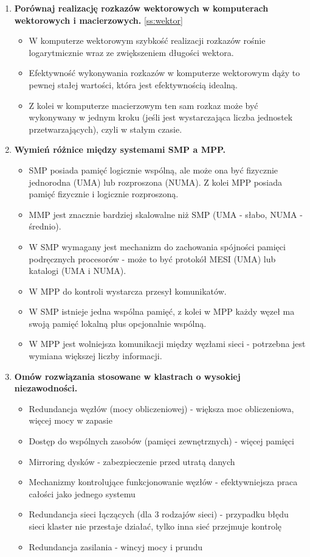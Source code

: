 \begin{enumerate}
\begin{itemize}
			\end{itemize}
			\item \textbf{Porównaj realizację rozkazów wektorowych w komputerach wektorowych i macierzowych.}
			\ref{ss:wektor}
			\begin{itemize}
				\item W komputerze wektorowym szybkość realizacji rozkazów rośnie logarytmicznie wraz ze zwiększeniem długości wektora.
				\item Efektywność wykonywania rozkazów w komputerze wektorowym dąży to pewnej stałej wartości, która jest efektywnością idealną.
				\item Z kolei w komputerze macierzowym ten sam rozkaz może być wykonywany w jednym kroku (jeśli jest wystarczająca liczba jednostek przetwarzających), czyli w stałym czasie.
			\end{itemize}
			\item \textbf{Wymień różnice między systemami SMP a MPP.}
			\begin{itemize}
				\item SMP posiada pamięć logicznie wspólną, ale może ona być fizycznie jednorodna (UMA) lub rozproszona (NUMA). Z kolei MPP posiada pamięć fizycznie i logicznie rozproszoną.
				\item MMP jest znacznie bardziej skalowalne niż SMP (UMA - słabo, NUMA - średnio).
				\item W SMP wymagany jest mechanizm do zachowania spójności pamięci podręcznych procesorów - może to być protokół MESI (UMA) lub katalogi (UMA i NUMA).
				\item W MPP do kontroli wystarcza przesył komunikatów.
				\item W SMP istnieje jedna wspólna pamięć, z kolei w MPP każdy węzeł ma swoją pamięć lokalną plus opcjonalnie wspólną.
				\item W MPP jest wolniejsza komunikacji między węzłami sieci - potrzebna jest wymiana większej liczby informacji.
			\end{itemize}
			\item \textbf{Omów rozwiązania stosowane w klastrach o wysokiej niezawodności.}
			\begin{itemize}
				\item Redundancja węzłów (mocy obliczeniowej) - większa moc obliczeniowa, więcej mocy w zapasie
				\item Dostęp do wspólnych zasobów (pamięci zewnętrznych) - więcej pamięci
				\item Mirroring dysków - zabezpieczenie przed utratą danych
				\item Mechanizmy kontrolujące funkcjonowanie węzłów - efektywniejsza praca całości jako jednego systemu
				\item Redundancja sieci łączących (dla 3 rodzajów sieci) - przypadku błędu sieci klaster nie przestaje działać, tylko inna sieć przejmuje kontrolę
				\item Redundancja zasilania - wincyj mocy i prundu
			\end{itemize}
		\end{enumerate}
